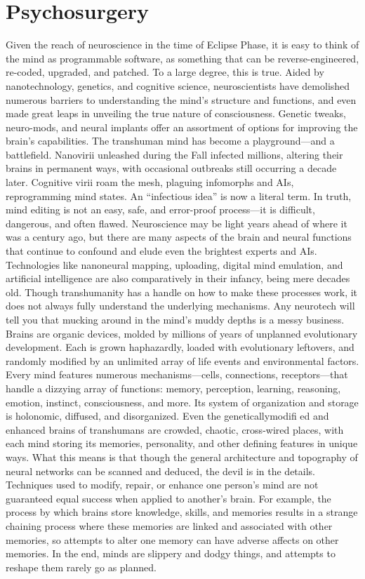 \section{Psychosurgery} Given the reach of neuroscience in the time of Eclipse Phase, it is easy to think of the mind as programmable software, as something that can be reverse-engineered, re-coded, upgraded, and patched. To a large degree, this is true. Aided by nanotechnology, genetics, and cognitive science, neuroscientists have demolished numerous barriers to understanding the mind’s structure and functions, and even made great leaps in unveiling the true nature of consciousness. Genetic tweaks, neuro-mods, and neural implants offer an assortment of options for improving the brain’s capabilities. The transhuman mind has become a playground—and a battlefield. Nanovirii unleashed during the Fall infected millions, altering their brains in permanent ways, with occasional outbreaks still occurring a decade later. Cognitive virii roam the mesh, plaguing infomorphs and AIs, reprogramming mind states. An “infectious idea” is now a literal term. In truth, mind editing is not an easy, safe, and error-proof process—it is difficult, dangerous, and often flawed. Neuroscience may be light years ahead of where it was a century ago, but there are many aspects of the brain and neural functions that continue to confound and elude even the brightest experts and AIs. Technologies like nanoneural mapping, uploading, digital mind emulation, and artificial intelligence are also comparatively in their infancy, being mere decades old. Though transhumanity has a handle on how to make these processes work, it does not always fully understand the underlying mechanisms. Any neurotech will tell you that mucking around in the mind’s muddy depths is a messy business. Brains are organic devices, molded by millions of years of unplanned evolutionary development. Each is grown haphazardly, loaded with evolutionary leftovers, and randomly modified by an unlimited array of life events and environmental factors. Every mind features numerous mechanisms—cells, connections, receptors—that handle a dizzying array of functions: memory, perception, learning, reasoning, emotion, instinct, consciousness, and more. Its system of organization and storage is holonomic, diffused, and disorganized. Even the geneticallymodifi ed and enhanced brains of transhumans are crowded, chaotic, cross-wired places, with each mind storing its memories, personality, and other defining features in unique ways. What this means is that though the general architecture and topography of neural networks can be scanned and deduced, the devil is in the details. Techniques used to modify, repair, or enhance one person’s mind are not guaranteed equal success when applied to another’s brain. For example, the process by which brains store knowledge, skills, and memories results in a strange chaining process where these memories are linked and associated with other memories, so attempts to alter one memory can have adverse affects on other memories. In the end, minds are slippery and dodgy things, and attempts to reshape them rarely go as planned. 


